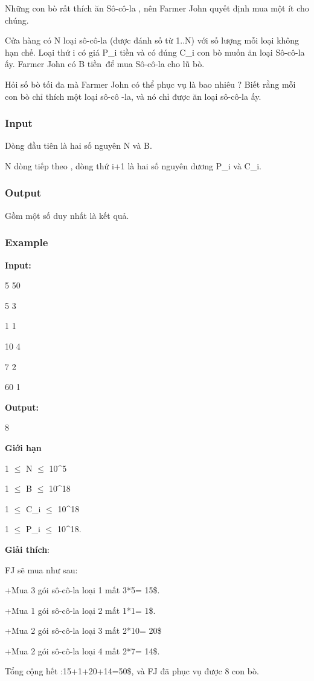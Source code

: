 

Những con bò rất thích ăn Sô-cô-la , nên Farmer John quyết định mua một ít cho chúng.

Cửa hàng có N loại sô-cô-la (được đánh số từ 1..N) với số lượng mỗi loại không hạn chế. Loại thứ i có giá P\_i tiền và có đúng C\_i con bò muốn ăn loại Sô-cô-la ấy. Farmer John có B tiền để mua Sô-cô-la cho lũ bò.

Hỏi số bò tối đa mà Farmer John có thể phục vụ là bao nhiêu ? Biết rằng mỗi con bò chỉ thích một loại sô-cô -la, và nó chỉ được ăn loại sô-cô-la ấy.

\subsubsection{Input}

Dòng đầu tiên là hai số nguyên N và B.

N dòng tiếp theo , dòng thứ i+1 là hai số nguyên dương P\_i và C\_i.

\subsubsection{Output}

Gồm một số duy nhất là kết quả.

\subsubsection{Example}

\textbf{Input:}


5 50


5 3


1 1


10 4


7 2


60 1


\textbf{Output:}


8








\textbf{​Giới hạn}





1 $\le$ N $\le$ 10^5


1  $\le$  B  $\le$  10^18


1  $\le$  C\_i  $\le$  10^18


1  $\le$  P\_i  $\le$  10^18.





\textbf{Giải thích}:


FJ sẽ mua như sau:


+Mua 3 gói sô-cô-la loại 1 mất 3*5= 15\$.


+Mua 1 gói sô-cô-la loại 2 mất 1*1= 1\$.


+Mua 2 gói sô-cô-la loại 3 mất 2*10= 20\$


+Mua 2 gói sô-cô-la loại 4 mất 2*7= 14\$.


Tổng cộng hết :15+1+20+14=50\$, và FJ đã phục vụ được 8 con bò.

 

 
